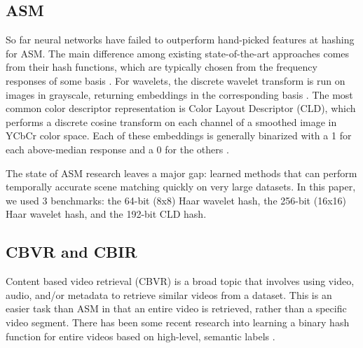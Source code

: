 \documentclass{article}
\begin{document}
\begin{multicols}{2}
\subsection{ASM}

So far neural networks have failed to outperform hand-picked features at hashing for ASM.
The main difference among existing state-of-the-art approaches comes from their hash functions, which are typically chosen from the frequency responses of some basis \cite{cbvr15}.
For wavelets, the discrete wavelet transform is run on images in grayscale, returning embeddings in the corresponding basis \cite{cbvr15}.
The most common color descriptor representation is Color Layout Descriptor (CLD), which performs a discrete cosine transform on each channel of a smoothed image in YCbCr color space.
Each of these embeddings is generally binarized with a 1 for each above-median response and a 0 for the others \cite{cbvir12}.


The state of ASM research leaves a major gap: learned methods that can perform temporally accurate scene matching quickly on very large datasets. In this paper, we used 3 benchmarks: the 64-bit (8x8) Haar wavelet hash, the 256-bit (16x16) Haar wavelet hash, and the 192-bit CLD hash.


\subsection{CBVR and CBIR}

Content based video retrieval (CBVR) is a broad topic that involves using video, audio, and/or metadata to retrieve similar videos from a dataset.
This is an easier task than ASM in that an entire video is retrieved, rather than a specific video segment.
There has been some recent research into learning a binary hash function for entire videos based on high-level, semantic labels \cite{video_deep17, video_mask17}.


\end{multicols}
\end{document}

